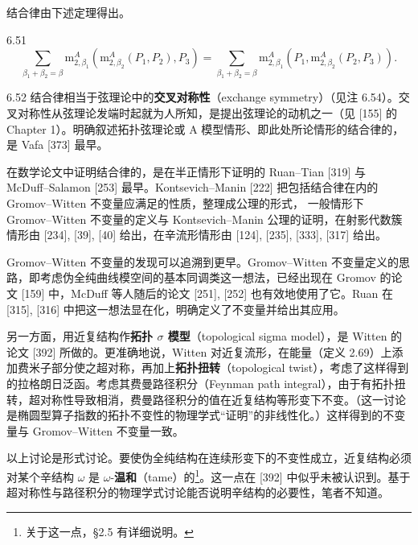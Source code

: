 结合律由下述定理得出。

\begin{theorem}{6.51}
  \[
    \sum_{\beta_1+\beta_2=\beta}\mathrm{m}_{2,\beta_1}^A\left(\mathrm{m}_{2,\beta_2}^A(P_1,P_2),P_3\right)=\sum_{\beta_1+\beta_2=\beta}\mathrm{m}_{2,\beta_1}^A\left(P_1,\mathrm{m}_{2,\beta_2}^A(P_2,P_3)\right).
  \]
\end{theorem}

\begin{remark}{6.52}
  结合律相当于弦理论中的\textbf{交叉对称性}（exchange symmetry）（见注 6.54）。交叉对称性从弦理论发端时起就为人所知，是提出弦理论的动机之一（见 [155] 的 Chapter 1）。明确叙述拓扑弦理论或 A 模型情形、即此处所论情形的结合律的，是 Vafa [373] 最早。

  在数学论文中证明结合律的，是在半正情形下证明的 Ruan–Tian [319] 与 McDuff–Salamon [253] 最早。Kontsevich–Manin [222] 把包括结合律在内的 Gromov–Witten 不变量应满足的性质，整理成公理的形式，
  一般情形下 Gromov–Witten 不变量的定义与 Kontsevich–Manin 公理的证明，在射影代数簇情形由 [234], [39], [40] 给出，在辛流形情形由 [124], [235], [333], [317] 给出。
\end{remark}

Gromov–Witten 不变量的发现可以追溯到更早。Gromov–Witten 不变量定义的思路，即考虑伪全纯曲线模空间的基本同调类这一想法，已经出现在 Gromov 的论文 [159] 中，McDuff 等人随后的论文 [251], [252] 也有效地使用了它。Ruan 在 [315], [316] 中把这一想法显在化，明确定义了不变量并给出其应用。

另一方面，用近复结构作\textbf{拓扑 $\sigma$ 模型}（topological sigma model），是 Witten 的论文 [392] 所做的。更准确地说，Witten 对近复流形，在能量（定义 2.69）上添加费米子部分使之超对称，再加上\textbf{拓扑扭转}（topological twist），考虑了这样得到的拉格朗日泛函。考虑其费曼路径积分（Feynman path integral），由于有拓扑扭转，超对称性导致相消，费曼路径积分的值在近复结构等形变下不变。（这一讨论是椭圆型算子指数的拓扑不变性的物理学式“证明”的非线性化。）这样得到的不变量与 Gromov–Witten 不变量一致。

以上讨论是形式讨论。要使伪全纯结构在连续形变下的不变性成立，近复结构必须对某个辛结构 $\omega$ 是 $\omega$-\textbf{温和}（tame）的\footnote{关于这一点，§2.5 有详细说明。}。这一点在 [392] 中似乎未被认识到。基于超对称性与路径积分的物理学式讨论能否说明辛结构的必要性，笔者不知道。

